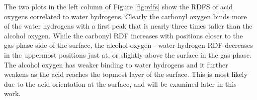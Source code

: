 The two plots in the left column of Figure \ref{fig:rdfs} show the RDFS of acid oxygens correlated to water hydrogens. Clearly the carbonyl oxygen binds more of the water hydrogens with a first peak that is nearly three times taller than the alcohol oxygen. While the carbonyl RDF increases with positions closer to the gas phase side of the surface, the alcohol-oxygen - water-hydrogen RDF decreases in the uppermost positions just at, or slightly above the surface in the gas phase. The alcohol oxygen has weaker binding to water hydrogens and it further weakens as the acid reaches the topmost layer of the surface. This is most likely due to the acid orientation at the surface, and will be examined later in this work.


